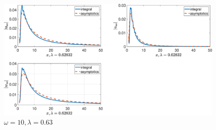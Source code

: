 \begin{figure}[!h]\centering\includegraphics[scale=0.38]{ussw10cp(1)2cp(2)1cs(1)0,5cs(20,3rho(1)2rho(2)1.eps}\caption{$ \omega = 10, \lambda = 0.63$}\end{figure}